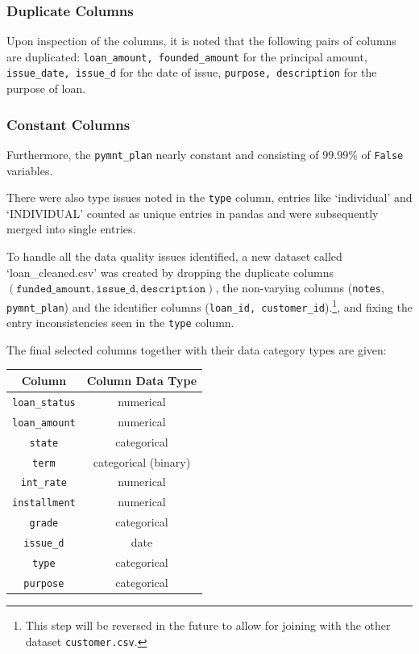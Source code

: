 \documentclass[a4paper, 10pt]{article}
\begin{document}
\subsubsection*{Duplicate Columns}
Upon inspection of the columns, it is noted that the following pairs of columns are duplicated:
\texttt{loan\_amount, founded\_amount} for the principal amount, \texttt{issue\_date, issue\_d} for the date of issue, \texttt{purpose, description} for the purpose of loan. 

\subsubsection*{Constant Columns}
Furthermore, the \texttt{pymnt\_plan} nearly constant and consisting of $99.99\%$ of \texttt{False} variables. 

There were also type issues noted in the \texttt{type} column, entries like `individual' and `INDIVIDUAL' counted as unique entries in pandas and were subsequently merged into single entries. 

To handle all the data quality issues identified, a new dataset called `loan\_cleaned.csv' was created by dropping the duplicate columns $(\texttt{funded\_amount}, \texttt{issue\_d}, \texttt{description})$, the non-varying columns (\texttt{notes}, \texttt{pymnt\_plan}) and the identifier columns (\texttt{loan\_id, customer\_id}).\footnote{This step will be reversed in the future to allow for joining with the other dataset \texttt{customer.csv}.}, and fixing the entry inconsistencies seen in the \texttt{type} column. 

The final selected columns together with their data category types are given:

\begin{table}
    \centering
    \begin{tabular}{c|c}
        \textbf{Column} & \textbf{Column Data Type} \\
         \hline
        \texttt{loan\_status} & numerical \\
        \texttt{loan\_amount} & numerical \\
        \texttt{state} & categorical \\
        \texttt{term} & categorical (binary) \\
        \texttt{int\_rate} & numerical \\
        \texttt{installment} & numerical \\
        \texttt{grade} & categorical \\
        \texttt{issue\_d} & date \\
        \texttt{type} & categorical \\
        \texttt{purpose} & categorical \\
    \end{tabular}
\end{table}
\end{document}
